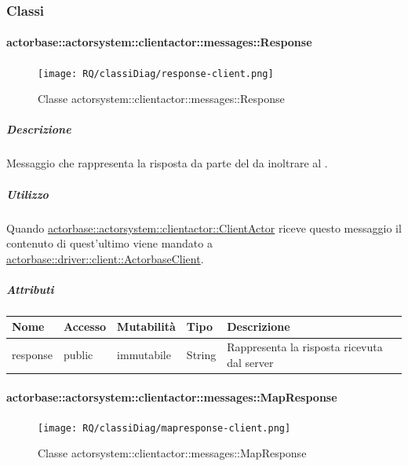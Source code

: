 \documentclass{scalatekids-article}
\begin{document}
\subsubsection{Classi}

\paragraph{actorbase::actorsystem::clientactor::messages::Response}
\label{sec:actorbase::actorsystem::clientactor::messages::Response}

\begin{figure}[H]
  \begin{center}
    \texttt{[image: RQ/classiDiag/response-client.png]}
    \caption{Classe actorsystem::clientactor::messages::Response}
  \end{center}
\end{figure}

\subparagraph{Descrizione}

Messaggio che rappresenta la risposta da parte del  da inoltrare
al .

\subparagraph{Utilizzo}

Quando \hyperref[sec:actorbase::actorsystem::clientactor::ClientActor]{actorbase::actorsystem::clientactor::ClientActor}
riceve questo messaggio il contenuto di quest'ultimo viene
mandato a \hyperref[sec:actorbase::driver::client::ActorbaseClient]{actorbase::driver::\allowbreak{}client::\allowbreak{}ActorbaseClient}.

\subparagraph{Attributi}
\begin{tabular}{| p{3cm} | p{1.5cm} | p{2cm} | p{2cm} | p{8.5cm} |}
  \hline
  Nome & Accesso & Mutabilità & Tipo & Descrizione\\
  \hline
  response & public & immutabile & String & Rappresenta la risposta ricevuta dal server \\
  \hline
\end{tabular}

\paragraph{actorbase::actorsystem::clientactor::messages::MapResponse}
\label{sec:actorbase::actorsystem::clientactor::messages::MapResponse}

\begin{figure}[H]
  \begin{center}
    \texttt{[image: RQ/classiDiag/mapresponse-client.png]}
    \caption{Classe actorsystem::clientactor::messages::MapResponse}
  \end{center}
\end{figure}
\end{document}
